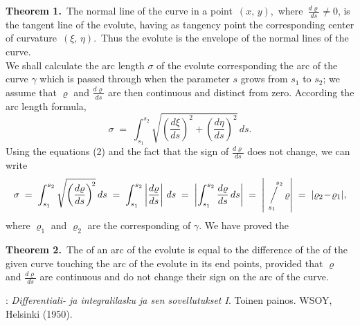 \documentclass[12pt]{article}
\newcommand{\sijoitus}[2]%
{\operatornamewithlimits{\Big/}_{\!\!\!#1}^{\,#2}}
\begin{document}
\textbf{Theorem 1.}\, The normal line of the curve in a point\, $(x,\,y)$,\, where\, $\displaystyle\frac{d\varrho}{ds} \neq 0$, is the tangent line of the evolute, having as tangency point the corresponding center of curvature\, $(\xi,\,\eta)$.\, Thus the evolute is the envelope of the normal lines of the curve.\\

We shall calculate the arc length $\sigma$ of the evolute corresponding the arc of the curve $\gamma$ which is passed through when the parameter $s$ grows from $s_1$ to $s_2$; we assume that $\varrho$ and $\frac{d\varrho}{ds}$ are then continuous and distinct from zero.  According the arc length formula,
 $$\sigma \;=\; \int_{s_1}^{s_2}\sqrt{\left(\frac{d\xi}{ds}\right)^{\!2}+\left(\frac{d\eta}{ds}\right)^{\!2}}\,ds.$$
Using the equations (2) and the fact that the sign of $\frac{d\varrho}{ds}$ does not change, we can write
 $$\sigma \;=\; \int_{s_1}^{s_2}\sqrt{\left(\frac{d\varrho}{ds}\right)^{\!2}}\,ds \;=\; 
  \int_{s_1}^{s_2}\left|\frac{d\varrho}{ds}\right|\,ds \;=\; \left|\int_{s_1}^{s_2}\frac{d\varrho}{ds}\,ds\right|
\;=\; \left|\sijoitus{s_1}{\quad s_2}\varrho\right| \;=\; |\varrho_2\!-\!\varrho_1|,$$
where $\varrho_1$ and $\varrho_2$ are the corresponding  of $\gamma$.  We have proved the

\textbf{Theorem 2.}\, The  of an arc of the evolute is equal to the difference of the  of the given curve touching the arc of the evolute in its end points, provided that $\varrho$ and $\frac{d\varrho}{ds}$ are continuous and do not change their sign on the arc of the curve.

\begin{thebibliography}{8}
: {\em Differentiali- ja integralilasku
ja sen sovellutukset I}.  Toinen painos. WSOY, Helsinki (1950).
\end{thebibliography} 

\end{document}

